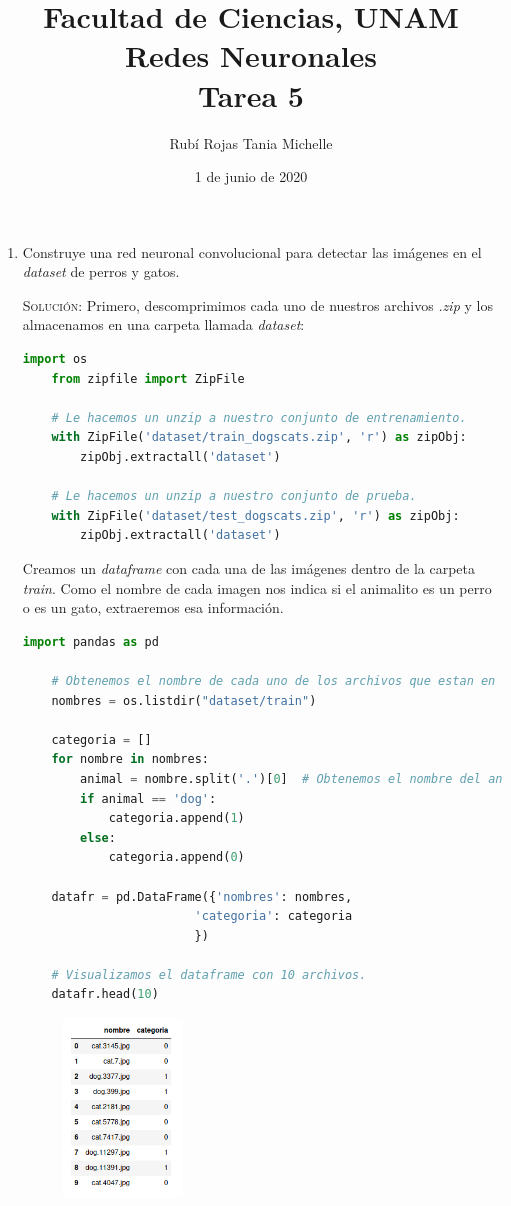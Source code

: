 \documentclass[letterpaper,11pt]{article}
\title{Facultad de Ciencias, UNAM \\ Redes Neuronales \\ Tarea 5}
\author{Rubí Rojas Tania Michelle}
\date{1 de junio de 2020}
\begin{document}
\maketitle

\begin{enumerate}
    \item Construye una red neuronal convolucional para detectar las imágenes
    en el \textit{dataset} de perros y gatos. 

    \textsc{Solución:} Primero, descomprimimos cada uno de nuestros archivos 
    \textit{.zip} y los almacenamos en una carpeta llamada \textit{dataset}:
    \begin{lstlisting}[language=Python]
    import os
    from zipfile import ZipFile

    # Le hacemos un unzip a nuestro conjunto de entrenamiento.
    with ZipFile('dataset/train_dogscats.zip', 'r') as zipObj:
        zipObj.extractall('dataset')

    # Le hacemos un unzip a nuestro conjunto de prueba.
    with ZipFile('dataset/test_dogscats.zip', 'r') as zipObj:
        zipObj.extractall('dataset')
    \end{lstlisting}

    Creamos un \textit{dataframe} con cada una de las imágenes dentro de la 
    carpeta \textit{train}. Como el nombre de cada imagen nos indica si el 
    animalito es un perro o es un gato, extraeremos esa información.
    \begin{lstlisting}[language=Python]
    import pandas as pd 

    # Obtenemos el nombre de cada uno de los archivos que estan en train.
    nombres = os.listdir("dataset/train")

    categoria = []
    for nombre in nombres:
        animal = nombre.split('.')[0]  # Obtenemos el nombre del animalito.
        if animal == 'dog':
            categoria.append(1)
        else:
            categoria.append(0)

    datafr = pd.DataFrame({'nombres': nombres, 
                        'categoria': categoria
                        })

    # Visualizamos el dataframe con 10 archivos.
    datafr.head(10)
    \end{lstlisting}

    \begin{figure}[ht]
        \centering
        \includegraphics[width=0.3\textwidth]{./imagenes/dataframe.png}
    \end{figure} 


\end{enumerate}
\end{document}
